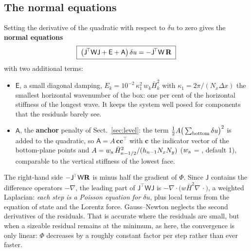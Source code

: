 \subsection{The normal equations}\label{sec:normal}
Setting the derivative of the quadratic with respect to $\delta u$ to zero gives the \textbf{normal equations}
\begin{equation}
\boxed{\;\big(\mathsf J^{\!\top}\mathsf W\mathsf J+\mathsf E+\mathsf A\big)\,\delta u=-\mathsf J^{\!\top}\mathsf W\,\mathbf R\;}
\label{eq:normal}
\end{equation}
with two additional terms:
\begin{itemize}
\item $\mathsf E$, a small diagonal damping, $E_k=10^{-2}\,\kappa_1^2\,w_k\bar H_k^2$ with $\kappa_1=2\pi/(N_x\Delta x)$ the
smallest horizontal wavenumber of the box: one per cent of the horizontal stiffness of the longest wave. It keeps the
system well posed for components that the residuals barely see.
\item $\mathsf A$, the \textbf{anchor} penalty of Sect.~\ref{sec:level}: the term $\tfrac12A\big(\sum_{\rm bottom}\delta
u\big)^2$ is added to the quadratic, so $\mathsf A=A\,\mathbf c\mathbf c^{\!\top}$ with $\mathbf c$ the indicator vector of
the bottom-plane points and $A=w_{\rm a}\,\bar H_{n-1/2}^2/(h_{n-1}N_xN_y)$ ($w_{\rm a}$ = , default 1),
comparable to the vertical stiffness of the lowest face.
\end{itemize}
The right-hand side $-\mathsf J^{\!\top}\mathsf W\mathbf R$ is minus half the gradient of $\Phi$. Since $\mathsf J$ contains the
difference operators $-\nabla$, the leading part of $\mathsf J^{\!\top}\mathsf W\mathsf J$ is
$-\nabla\cdot\big(w\bar H^2\nabla\,\cdot\big)$, a weighted Laplacian: \emph{each step is a Poisson equation for $\delta u$},
plus local terms from the equation of state and the Lorentz force. Gauss--Newton neglects the second derivatives of the
residuals. That is accurate where the residuals are small, but when a sizeable residual remains at the minimum, as here,
the convergence is only linear: $\Phi$ decreases by a roughly constant factor per step rather than ever faster.

